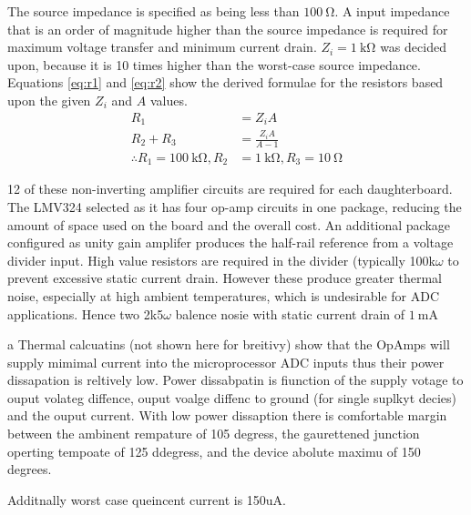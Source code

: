 The source impedance is specified as being less than $\SI{100}{\ohm}$.
A input impedance that is an order of magnitude higher than the source impedance is required for maximum voltage transfer and minimum current drain.
$Z_i = \SI{1}{\kilo\ohm}$ was decided upon, because it is 10 times higher than the worst-case source impedance.
Equations \ref{eq:r1} and \ref{eq:r2} show the derived formulae for the resistors based upon the given $Z_i$ and $A$ values.
\begin{align}
	R_1 &= Z_i A \label{eq:r1} \\
	R_2 + R_3 &= \frac{Z_i A}{A - 1} \label{eq:r2} \\[1em]
	\therefore R_1 = \SI{100}{\kilo\ohm}, R_2 &= \SI{1}{\kilo\ohm}, R_3 = \SI{10}{\ohm} \nonumber
\end{align}

12 of these non-inverting amplifier circuits are required for each daughterboard.
The LMV324 selected as it has four op-amp circuits in one package, reducing the amount of space used on the board and the overall cost.
An additional package configured as unity gain amplifer produces the half-rail reference from a voltage divider input.
High value resistors are required in the divider (typically 100k$\omega$ to prevent excessive static current drain.
However these produce greater thermal noise, especially at high ambient temperatures, which is undesirable for ADC applications. Hence two 2k5$\omega$ balence nosie with 
static current drain of $\SI{1}{\milli\ampere}$

a 
Thermal calcuatins (not shown here for breitivy) show that the OpAmps will supply mimimal current into the microprocessor ADC inputs thus their power dissapation is reltively low.
Power dissabpatin is fiunction of the supply votage to ouput volateg diffence, ouput voalge diffenc to ground (for single suplkyt decies) and the ouput current.
With low power dissaption there is comfortable margin between the ambinent rempature of 105 degress, the gaurettened junction operting tempoate of 125 ddegress, and the device abolute maximu of 150 degrees.

Additnally worst case queincent current is 150uA.